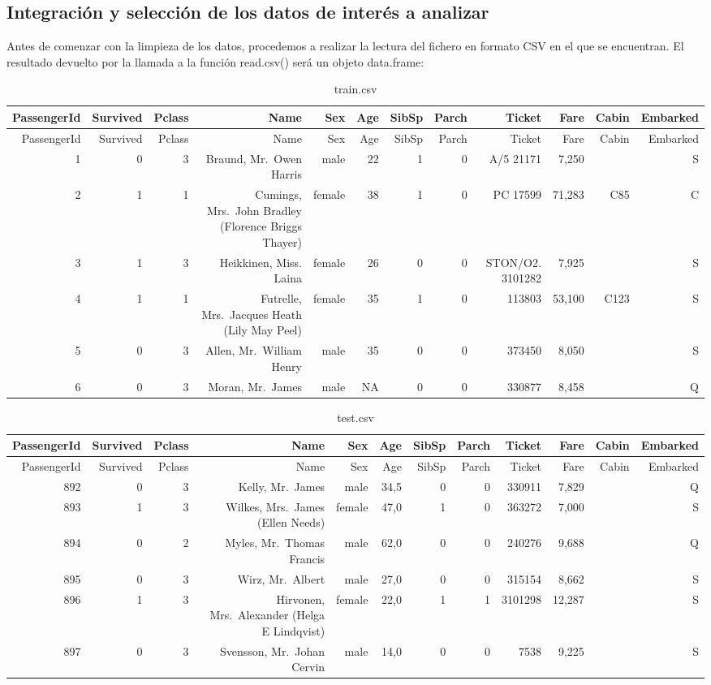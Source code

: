 \documentclass[]{article}
\begin{document}
\subsection{Integración y selección de los datos de interés a
analizar}\label{integracion-y-seleccion-de-los-datos-de-interes-a-analizar}

Antes de comenzar con la limpieza de los datos, procedemos a realizar la
lectura del fichero en formato CSV en el que se encuentran. El resultado
devuelto por la llamada a la función read.csv() será un objeto
data.frame:

\begin{longtable}[]{@{}rrrrrrrrrrrr@{}}
\caption{train.csv}\tabularnewline
\toprule
PassengerId & Survived & Pclass & Name & Sex & Age & SibSp & Parch &
Ticket & Fare & Cabin & Embarked\tabularnewline
\midrule
\endfirsthead
\toprule
PassengerId & Survived & Pclass & Name & Sex & Age & SibSp & Parch &
Ticket & Fare & Cabin & Embarked\tabularnewline
\midrule
\endhead
1 & 0 & 3 & Braund, Mr.~Owen Harris & male & 22 & 1 & 0 & A/5 21171 &
7,250 & & S\tabularnewline
2 & 1 & 1 & Cumings, Mrs.~John Bradley (Florence Briggs Thayer) & female
& 38 & 1 & 0 & PC 17599 & 71,283 & C85 & C\tabularnewline
3 & 1 & 3 & Heikkinen, Miss. Laina & female & 26 & 0 & 0 & STON/O2.
3101282 & 7,925 & & S\tabularnewline
4 & 1 & 1 & Futrelle, Mrs.~Jacques Heath (Lily May Peel) & female & 35 &
1 & 0 & 113803 & 53,100 & C123 & S\tabularnewline
5 & 0 & 3 & Allen, Mr.~William Henry & male & 35 & 0 & 0 & 373450 &
8,050 & & S\tabularnewline
6 & 0 & 3 & Moran, Mr.~James & male & NA & 0 & 0 & 330877 & 8,458 & &
Q\tabularnewline
\bottomrule
\end{longtable}

\begin{longtable}[]{@{}rrrrrrrrrrrr@{}}
\caption{test.csv}\tabularnewline
\toprule
PassengerId & Survived & Pclass & Name & Sex & Age & SibSp & Parch &
Ticket & Fare & Cabin & Embarked\tabularnewline
\midrule
\endfirsthead
\toprule
PassengerId & Survived & Pclass & Name & Sex & Age & SibSp & Parch &
Ticket & Fare & Cabin & Embarked\tabularnewline
\midrule
\endhead
892 & 0 & 3 & Kelly, Mr.~James & male & 34,5 & 0 & 0 & 330911 & 7,829 &
& Q\tabularnewline
893 & 1 & 3 & Wilkes, Mrs.~James (Ellen Needs) & female & 47,0 & 1 & 0 &
363272 & 7,000 & & S\tabularnewline
894 & 0 & 2 & Myles, Mr.~Thomas Francis & male & 62,0 & 0 & 0 & 240276 &
9,688 & & Q\tabularnewline
895 & 0 & 3 & Wirz, Mr.~Albert & male & 27,0 & 0 & 0 & 315154 & 8,662 &
& S\tabularnewline
896 & 1 & 3 & Hirvonen, Mrs.~Alexander (Helga E Lindqvist) & female &
22,0 & 1 & 1 & 3101298 & 12,287 & & S\tabularnewline
897 & 0 & 3 & Svensson, Mr.~Johan Cervin & male & 14,0 & 0 & 0 & 7538 &
9,225 & & S\tabularnewline
\bottomrule
\end{longtable}
\end{document}
